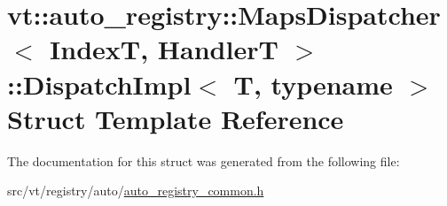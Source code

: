 \hypertarget{structvt_1_1auto__registry_1_1_maps_dispatcher_1_1_dispatch_impl}{}\section{vt\+:\+:auto\+\_\+registry\+:\+:Maps\+Dispatcher$<$ IndexT, HandlerT $>$\+:\+:Dispatch\+Impl$<$ T, typename $>$ Struct Template Reference}
\label{structvt_1_1auto__registry_1_1_maps_dispatcher_1_1_dispatch_impl}


The documentation for this struct was generated from the following file\+:\begin{DoxyCompactItemize}
\item 
src/vt/registry/auto/\hyperlink{auto__registry__common_8h}{auto\+\_\+registry\+\_\+common.\+h}\end{DoxyCompactItemize}
